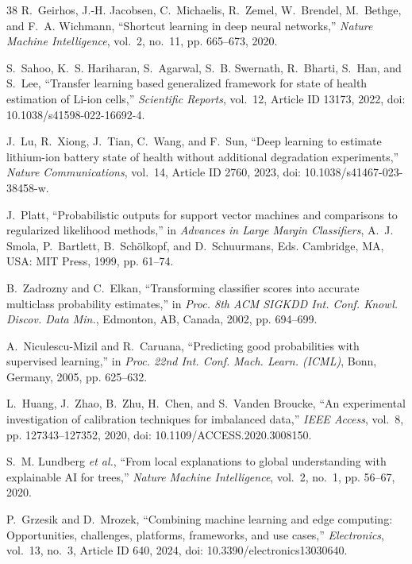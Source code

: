 \documentclass[11pt,a4paper]{article}
\begin{document}
\begin{thebibliography}{38}
R.~Geirhos, J.-H. Jacobsen, C.~Michaelis, R.~Zemel, W.~Brendel, M.~Bethge, and F.~A. Wichmann, ``Shortcut learning in deep neural networks,'' \emph{Nature Machine Intelligence}, vol.~2, no.~11, pp. 665--673, 2020.

S.~Sahoo, K.~S. Hariharan, S.~Agarwal, S.~B. Swernath, R.~Bharti, S.~Han, and S.~Lee, ``Transfer learning based generalized framework for state of health estimation of Li-ion cells,'' \emph{Scientific Reports}, vol.~12, Article ID 13173, 2022, doi: 10.1038/s41598-022-16692-4.

J.~Lu, R.~Xiong, J.~Tian, C.~Wang, and F.~Sun, ``Deep learning to estimate lithium-ion battery state of health without additional degradation experiments,'' \emph{Nature Communications}, vol.~14, Article ID 2760, 2023, doi: 10.1038/s41467-023-38458-w.

J.~Platt, ``Probabilistic outputs for support vector machines and comparisons to regularized likelihood methods,'' in \emph{Advances in Large Margin Classifiers}, A.~J. Smola, P.~Bartlett, B.~Sch\"olkopf, and D.~Schuurmans, Eds. Cambridge, MA, USA: MIT Press, 1999, pp. 61--74.

B.~Zadrozny and C.~Elkan, ``Transforming classifier scores into accurate multiclass probability estimates,'' in \emph{Proc. 8th ACM SIGKDD Int. Conf. Knowl. Discov. Data Min.}, Edmonton, AB, Canada, 2002, pp. 694--699.

A.~Niculescu-Mizil and R.~Caruana, ``Predicting good probabilities with supervised learning,'' in \emph{Proc. 22nd Int. Conf. Mach. Learn. (ICML)}, Bonn, Germany, 2005, pp. 625--632.

L.~Huang, J.~Zhao, B.~Zhu, H.~Chen, and S.~Vanden Broucke, ``An experimental investigation of calibration techniques for imbalanced data,'' \emph{IEEE Access}, vol.~8, pp. 127343--127352, 2020, doi: 10.1109/ACCESS.2020.3008150.

S.~M. Lundberg \emph{et al.}, ``From local explanations to global understanding with explainable AI for trees,'' \emph{Nature Machine Intelligence}, vol.~2, no.~1, pp. 56--67, 2020.

P.~Grzesik and D.~Mrozek, ``Combining machine learning and edge computing: Opportunities, challenges, platforms, frameworks, and use cases,'' \emph{Electronics}, vol.~13, no.~3, Article ID 640, 2024, doi: 10.3390/electronics13030640.


\end{thebibliography}
\end{document}
